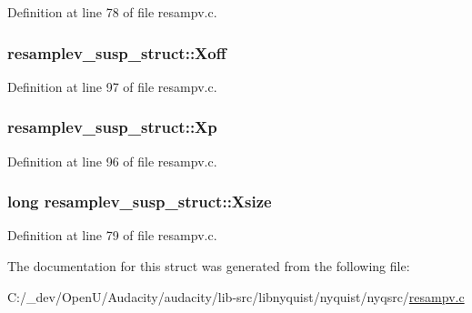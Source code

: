 Definition at line 78 of file resampv.\+c.

\subsubsection[{\texorpdfstring{Xoff}{Xoff}}]{ resamplev\+\_\+susp\+\_\+struct\+::\+Xoff}\hypertarget{structresamplev__susp__struct_ae8344f156386fd446dde94b31c0b7ee2}{}\label{structresamplev__susp__struct_ae8344f156386fd446dde94b31c0b7ee2}


Definition at line 97 of file resampv.\+c.

\subsubsection[{\texorpdfstring{Xp}{Xp}}]{ resamplev\+\_\+susp\+\_\+struct\+::\+Xp}\hypertarget{structresamplev__susp__struct_a01fb5edc5c9e7499286968ab0f828046}{}\label{structresamplev__susp__struct_a01fb5edc5c9e7499286968ab0f828046}


Definition at line 96 of file resampv.\+c.

\subsubsection[{\texorpdfstring{Xsize}{Xsize}}]{\setlength{\rightskip}{0pt plus 5cm}long resamplev\+\_\+susp\+\_\+struct\+::\+Xsize}\hypertarget{structresamplev__susp__struct_a199dc3d3e621bf2bf9abc9e3d50f49e6}{}\label{structresamplev__susp__struct_a199dc3d3e621bf2bf9abc9e3d50f49e6}


Definition at line 79 of file resampv.\+c.



The documentation for this struct was generated from the following file\+:\begin{DoxyCompactItemize}
\item 
C\+:/\+\_\+dev/\+Open\+U/\+Audacity/audacity/lib-\/src/libnyquist/nyquist/nyqsrc/\hyperlink{resampv_8c}{resampv.\+c}\end{DoxyCompactItemize}
